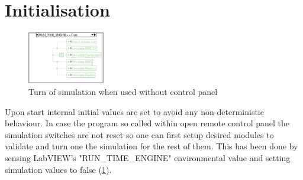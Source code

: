 \section{Initialisation}
\begin{figure}
    \centering
    \includegraphics[scale=\visc,max width=0.3\textwidth]{figures/Run_maind31.png}
    \caption{Turn of simulation when used without control panel}
    \label{vi:maind31}
    \vspace{-15pt}
\end{figure}
Upon start internal initial values are set to avoid any non-deterministic behaviour. In case the program so called within open remote control panel the simulation switches are not reset so one can first setup desired modules to validate and turn one the simulation for the rest of them.
This has been done by sensing LabVIEW's "RUN\_TIME\_ENGINE" environmental value and setting simulation values to false (\ref{vi:maind31}).
\\ \\
